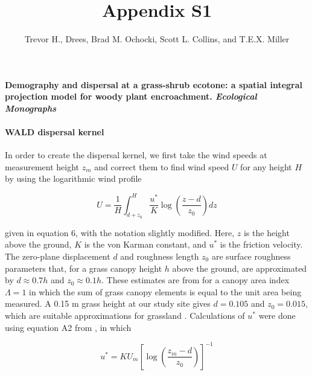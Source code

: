\documentclass[11pt]{article}\usepackage[]{graphicx}\usepackage[usenames,dvipsnames]{xcolor}
\title{Appendix S1}
\author{Trevor H., Drees, Brad M. Ochocki, Scott L. Collins, and T.E.X. Miller}
\date{\vspace{-5ex}}
\begin{document}
\maketitle
\noindent{} \textbf{Demography and dispersal at a grass-shrub ecotone: a spatial integral projection model for woody plant encroachment. \textit{Ecological Monographs}}

\renewcommand{\thefigure}{S\arabic{figure}}\setcounter{figure}{0}
\renewcommand{\thetable}{S\arabic{table}}\setcounter{table}{0}
\renewcommand{\theequation}{S\arabic{equation}}\setcounter{equation}{0}

\paragraph{WALD dispersal kernel}
In order to create the dispersal kernel, we first take the wind speeds at measurement height $z_{m}$ and correct them to find wind speed $U$ for any height $H$ by using the logarithmic wind profile

\begin{linenomath*} \begin{equation} U = \frac{1}{H} \int_{d+z_{0}}^{H} \frac{u^*}{K} \log \left(\frac{z-d}{z_{0}}\right) dz \end{equation} 
\end{linenomath*} 

given in \citet{bullock2012modelling} equation 6, with the notation slightly modified. 
Here, $z$ is the height above the ground, $K$ is the von Karman constant, and $u^*$ is the friction velocity.
The zero-plane displacement $d$ and roughness length $z_{0}$ are surface roughness parameters that, for a grass canopy height $h$ above the ground, are  approximated by $d \approx 0.7h$ and $z_{0} \approx 0.1h$.
These estimates are from \citet{raupach1994simplified} for a canopy area index $\Lambda = 1$ in which the sum of grass canopy elements is equal to the unit area being measured.
A 0.15 m grass height at our study site gives $d = 0.105$ and $z_{0} = 0.015$, which are suitable approximations for grassland \citep{wiernga1993representative}.
Calculations of $u^*$ were done using equation A2 from \citet{skarpaas2007dispersal}, in which 

\begin{linenomath*} \begin{equation} u^* = KU_{m} \left[\log\left(\frac{z_{m} - d}{z_{0}}\right)\right]^{-1} \end{equation} 
\end{linenomath*} 
\end{document}
